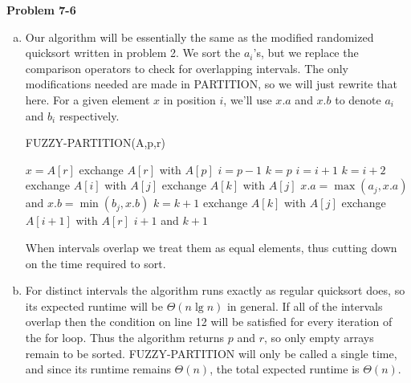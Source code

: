\documentclass{article}
\begin{document}
\noindent\textbf{Problem 7-6}\\
\begin{enumerate}[a.]
\item Our algorithm will be essentially the same as the modified randomized quicksort written in problem 2.  We sort the $a_i$'s, but we replace the comparison operators to check for overlapping intervals.  The only modifications needed are made in PARTITION, so we will just rewrite that here.  For a given element $x$ in position $i$, we'll use $x.a$ and $x.b$ to denote $a_i$ and $b_i$ respectively.

\begin{algorithm}
\caption{FUZZY-PARTITION(A,p,r)}
\begin{algorithmic}[1]
\State $x = A[r]$
\State exchange $A[r]$ with $A[p]$
\State $i=p-1$
\State $k = p$
		\State $i=i+1$
		\State $k = i+2$
		\State exchange $A[i]$ with $A[j]$
		\State exchange $A[k]$ with $A[j]$
	\EndIf
		\State $x.a = \max(a_j, x.a)$ and $x.b = \min(b_j, x.b)$
		\State $k = k+1$
		\State exchange $A[k]$ with $A[j]$
	\EndIf
\EndFor
\State exchange $A[i+1]$ with $A[r]$
\State \Return $i+1$ and $k+1$
\end{algorithmic}
\end{algorithm}
When intervals overlap we treat them as equal elements, thus cutting down on the time required to sort.  \\

\item For distinct intervals the algorithm runs exactly as regular quicksort does, so its expected runtime will be $\Theta(n \lg n)$ in general.  If all of the intervals overlap then the condition on line 12 will be satisfied for every iteration of the for loop.  Thus the algorithm returns $p$ and $r$, so only empty arrays remain to be sorted. FUZZY-PARTITION will only be called a single time, and since its runtime remains $\Theta(n)$, the total expected runtime is $\Theta(n)$.
\end{enumerate}
\end{document}
